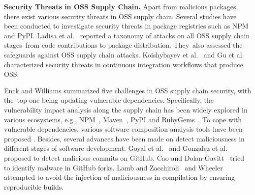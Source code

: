 






\textbf{Security Threats in OSS Supply Chain.} Apart from malicious packages, there exist various security threats in OSS supply chain. Several studies \cite{cappos2008look, bagmar2021know, zahan2022weak, kaplan2021survey, gu2022investigating} have been conducted to investigate security threats in package registries such as NPM and PyPI. Ladisa et al.~\cite{ladisa2022taxonomy} reported a taxonomy of attacks on all OSS supply chain stages~from code contributions to package distribution. They~also assessed the safeguards against OSS supply chain attacks. Koishybayev et al.~\cite{koishybayev2022characterizing} and Gu et al.~\cite{Gu2023} characterized security threats in continuous integration workflows that produce OSS.

Enck and Williams \cite{enck2022top} summarized five challenges in OSS supply chain security, with the~top one being updating vulnerable dependencies. Specifically, the vulnerability impact analysis along the supply chain has been widely explored in various ecosystems, e.g., NPM~\cite{zerouali2022impact, zimmermann2019small, liu2022demystifying}, Maven~\cite{prana2021out, gkortzis2021software, huang2022characterizing}, PyPI\cite{ruohonen2021large, alfadel2023empirical, prana2021out} and RubyGems~\cite{zerouali2022impact, prana2021out}. To cope with vulnerable dependencies, various software composition analysis tools have been proposed \cite{xu2022insight, ponta2018beyond, liu2022demystifying, huang2022characterizing}.  Besides, several advances have been made on detect maliciousness in different stages of software development. Goyal et al.~\cite{goyal2018identifying} and Gonzalez et al.~\cite{gonzalez2021anomalicious} proposed to detect malicious commits on GitHub. Cao and Dolan-Gavitt~\cite{cao2022fork} tried to identify malware in GitHub forks. Lamb and Zacchiroli~\cite{lamb2021reproducible} and Wheeler \cite{wheeler2005countering} attempted to avoid the injection of maliciousness in compilation by ensuring reproducible builds.

